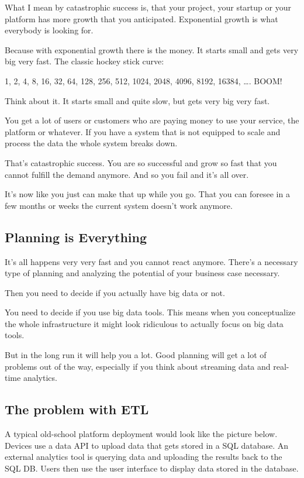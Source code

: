 \documentclass[12pt, numbers=noenddot]{scrreprt} %
\begin{document}
What I mean by catastrophic success is, that your project, your startup or your platform has more growth that you anticipated. Exponential growth is what everybody is looking for.

Because with exponential growth there is the money. It starts small and gets very big very fast. The classic hockey stick curve:

1, 2, 4, 8, 16, 32, 64, 128, 256, 512, 1024, 2048, 4096, 8192, 16384, …. BOOM!

Think about it. It starts small and quite slow, but gets very big very fast.

You get a lot of users or customers who are paying money to use your service, the platform or whatever. If you have a system that is not equipped to scale and process the data the whole system breaks down.

That’s catastrophic success. You are so successful and grow so fast that you cannot fulfill the demand anymore. And so you fail and it’s all over.

It’s now like you just can make that up while you go. That you can foresee in a few months or weeks the current system doesn’t work anymore.

\subsection{Planning is Everything}

It’s all happens very very fast and you cannot react anymore. There’s a necessary type of planning and analyzing the potential of your business case necessary.

Then you need to decide if you actually have big data or not.

You need to decide if you use big data tools. This means when you conceptualize the whole infrastructure it might look ridiculous to actually focus on big data tools.

But in the long run it will help you a lot. Good planning will get a lot of problems out of the way, especially if you think about streaming data and real-time analytics.

\subsection{The problem with ETL}
A typical old-school platform deployment would look like the picture below. Devices use a data API to upload data that gets stored in a SQL database. An external analytics tool is querying data and uploading the results back to the SQL DB. Users then use the user interface to display data stored in the database.
\end{document}
